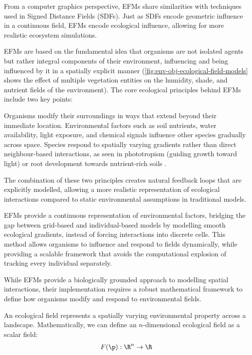 From a computer graphics perspective, EFMs share similarities with techniques used in Signed Distance Fields (SDFs). Just as SDFs encode geometric influence in a continuous field, EFMs encode ecological influence, allowing for more realistic ecosystem simulations.

EFMs are based on the fundamental idea that organisms are not isolated agents but rather integral components of their environment, influencing and being influenced by it in a spatially explicit manner (\cref{fig:env-obj-ecological-field-models} shows the effect of multiple vegetation entities on the humidity, shade, and nutrient fields of the environment). The core ecological principles behind EFMs include two key points:
\begin{Itemize}
     Organisms modify their surroundings in ways that extend beyond their immediate location. Environmental factors such as soil nutrients, water availability, light exposure, and chemical signals influence other species gradually across space.
     Species respond to spatially varying gradients rather than direct neighbour-based interactions, as seen in phototropism (guiding growth toward light) \cite{Pirk2012} or root development towards nutrient-rich soils \cite{Li2023}.
\end{Itemize}

The combination of these two principles creates natural feedback loops that are explicitly modelled, allowing a more realistic representation of ecological interactions compared to static environmental assumptions in traditional models.

EFMs provide a continuous representation of environmental factors, bridging the gap between grid-based and individual-based models by modelling smooth ecological gradients, instead of forcing interactions into discrete cells. This method allows organisms to influence and respond to fields dynamically, while providing a scalable framework that avoids the computational explosion of tracking every individual separately.

While EFMs provide a biologically grounded approach to modelling spatial interactions, their implementation requires a robust mathematical framework to define how organisms modify and respond to environmental fields.





An ecological field represents a spatially varying environmental property across a landscape. Mathematically, we can define an $n$-dimensional ecological field as a scalar field:
\begin{align}
F(\p) : \R^n \to \R
\end{align}

